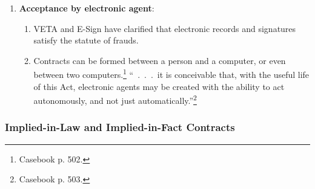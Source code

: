 \begin{enumerate}
\begin{enumerate}
        say that a seller of goods like these could wait indefinitely to 
        decide whether or not he will accept the offer of the proposed 
        buyer.''\footnote{Casebook p. 497.} \emph{Cole-McIntyre-Norfleet Co. 
        v. Holloway}. In some cases, there is a duty to promptly reply, and 
        unreasonable delay will count as acceptance---e.g., a hail insurer 
        waiting two months to send a rejection. \emph{Kukusa v. Home Mut. 
        Hail-Tornado Ins. Co.}
        \item Repeated orders for the same product can count as a \textbf{standing 
        offer}. If the buyer does not reject future shipments, his silence 
        counts as acceptance. \emph{Hobbs v. Massasoit Whip Co.}
        \item Taking physical control of shipped goods counts as acceptance of 
        the shipment. \emph{Louisville Tin \& Stove Co. v. Lay}.
        \item If you enjoy the benefit of an unwanted thing, you have to pay 
        for it---e.g., an expired newspaper subscription. \emph{Austin v. 
        Burge}.
        \item A \textbf{negative-option} plan involves a subscription for 
        merchandise, like a book or record club. They differ from unordered 
        goods in that the customer contracts in advance.
    \end{enumerate}
    \item \textbf{Acceptance by electronic agent}:
    \begin{enumerate}
        \item VETA and E-Sign have clarified that electronic records and 
        signatures satisfy the statute of frauds.
        \item Contracts can be formed between a person and a computer, or even 
        between two computers.\footnote{Casebook p. 502.} ``~.~.~.~it is 
        conceivable that, with the useful life of this Act, electronic agents 
        may be created with the ability to act autonomously, and not just 
        automatically.''\footnote{Casebook p. 503.}
    \end{enumerate}
\end{enumerate}

\subsubsection{Implied-in-Law and Implied-in-Fact Contracts}


